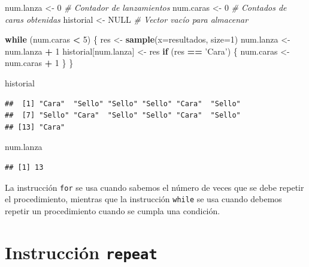 \documentclass[10pt,]{krantz}
\makeatletter
\newenvironment{Shaded}{\begin{snugshade}}{\end{snugshade}}
\newcommand{\KeywordTok}[1]{\textcolor[rgb]{0.13,0.29,0.53}{\textbf{#1}}}
\newcommand{\DataTypeTok}[1]{\textcolor[rgb]{0.13,0.29,0.53}{#1}}
\newcommand{\DecValTok}[1]{\textcolor[rgb]{0.00,0.00,0.81}{#1}}
\newcommand{\StringTok}[1]{\textcolor[rgb]{0.31,0.60,0.02}{#1}}
\newcommand{\CommentTok}[1]{\textcolor[rgb]{0.56,0.35,0.01}{\textit{#1}}}
\newcommand{\OtherTok}[1]{\textcolor[rgb]{0.56,0.35,0.01}{#1}}
\newcommand{\ControlFlowTok}[1]{\textcolor[rgb]{0.13,0.29,0.53}{\textbf{#1}}}
\newcommand{\OperatorTok}[1]{\textcolor[rgb]{0.81,0.36,0.00}{\textbf{#1}}}
\newcommand{\NormalTok}[1]{#1}
\newenvironment{kframe}{%
\medskip{}
\setlength{\fboxsep}{.8em}
 \def\at@end@of@kframe{}%
 \ifinner\ifhmode%
  \def\at@end@of@kframe{\end{minipage}}%
  \begin{minipage}{\columnwidth}%
 \fi\fi%
 \def\FrameCommand##1{\hskip\@totalleftmargin \hskip-\fboxsep
 \colorbox{shadecolor}{##1}\hskip-\fboxsep
     \hskip-\linewidth \hskip-\@totalleftmargin \hskip\columnwidth}%
 \MakeFramed {\advance\hsize-\width
   \@totalleftmargin\z@ \linewidth\hsize
   \@setminipage}}%
 {\par\unskip\endMakeFramed%
 \at@end@of@kframe}
\renewenvironment{Shaded}{\begin{kframe}}{\end{kframe}}
\let\BeginKnitrBlock\begin \let\EndKnitrBlock\end
\makeatother
\begin{document}
\begin{Shaded}
\begin{Highlighting}[]
\NormalTok{num.lanza <-}\StringTok{ }\DecValTok{0}     \CommentTok{# Contador de lanzamientos}
\NormalTok{num.caras <-}\StringTok{ }\DecValTok{0}     \CommentTok{# Contados de caras obtenidas}
\NormalTok{historial <-}\StringTok{ }\OtherTok{NULL}  \CommentTok{# Vector vacío para almacenar}

\ControlFlowTok{while}\NormalTok{ (num.caras }\OperatorTok{<}\StringTok{ }\DecValTok{5}\NormalTok{) \{}
\NormalTok{  res <-}\StringTok{ }\KeywordTok{sample}\NormalTok{(}\DataTypeTok{x=}\NormalTok{resultados, }\DataTypeTok{size=}\DecValTok{1}\NormalTok{)}
\NormalTok{  num.lanza <-}\StringTok{ }\NormalTok{num.lanza }\OperatorTok{+}\StringTok{ }\DecValTok{1}
\NormalTok{  historial[num.lanza] <-}\StringTok{ }\NormalTok{res}
  \ControlFlowTok{if}\NormalTok{ (res }\OperatorTok{==}\StringTok{ 'Cara'}\NormalTok{) \{}
\NormalTok{    num.caras <-}\StringTok{ }\NormalTok{num.caras }\OperatorTok{+}\StringTok{ }\DecValTok{1}
\NormalTok{  \}}
\NormalTok{\}}

\NormalTok{historial}
\end{Highlighting}
\end{Shaded}

\begin{verbatim}
##  [1] "Cara"  "Sello" "Sello" "Sello" "Cara"  "Sello"
##  [7] "Sello" "Cara"  "Sello" "Sello" "Cara"  "Sello"
## [13] "Cara"
\end{verbatim}

\begin{Shaded}
\begin{Highlighting}[]
\NormalTok{num.lanza}
\end{Highlighting}
\end{Shaded}

\begin{verbatim}
## [1] 13
\end{verbatim}

\BeginKnitrBlock{rmdnote}
La instrucción \texttt{for} se usa cuando sabemos el número de veces que
se debe repetir el procedimiento, mientras que la instrucción
\texttt{while} se usa cuando debemos repetir un procedimiento cuando se
cumpla una condición.
\EndKnitrBlock{rmdnote}

\section{\texorpdfstring{Instrucción \texttt{repeat}
}{Instrucción repeat }}\label{instruccion-repeat}
\end{document}
